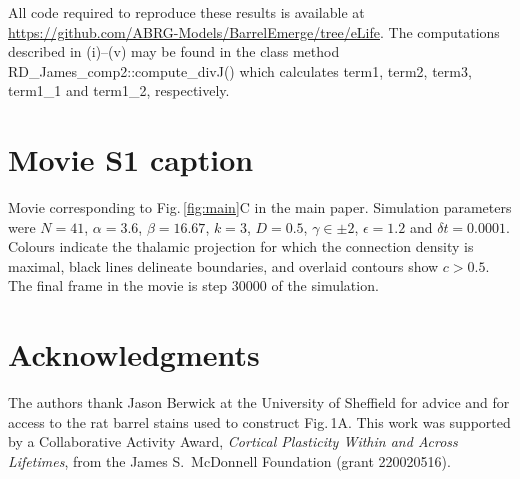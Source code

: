 \documentclass[9pt,lineno]{elife}
\newcommand{\MPtwo}[1]{\textcolor{colmptwo}{#1}}
\newcommand{\code}[1]{\textsf{#1}}
\begin{document}
All code required to reproduce these results is available at
\url{https://github.com/ABRG-Models/BarrelEmerge/tree/eLife}. The computations
described in (i)--(v) may be found in the class method
\code{RD\_James\MPtwo{\_comp2}::compute\_divJ()} which calculates \code{term1},
\code{term2}, \code{term3}, \code{term1\_1} and \code{term1\_2}, respectively.

\section{Movie S1 caption}

Movie corresponding to Fig.\,\ref{fig:main}C in the main paper. Simulation parameters were
$N=41$, $\alpha=3.6$, $\beta=16.67$, $k=3$, $D=0.5$, $\gamma\in\pm 2$,
$\epsilon=1.2$ and $\delta{t}=0.0001$. Colours indicate the thalamic
projection for which the connection density is maximal, black lines delineate
boundaries, and overlaid contours show $c>0.5$. The final frame in the movie
is step 30000 of the simulation.

\section{Acknowledgments}

The authors thank Jason Berwick at the University of Sheffield for advice and
for access to the rat barrel stains used to construct Fig.\,1A. This work was
supported by a Collaborative Activity Award, \emph{Cortical Plasticity Within
  and Across Lifetimes}, from the James S.~McDonnell Foundation (grant
220020516).


\end{document}
